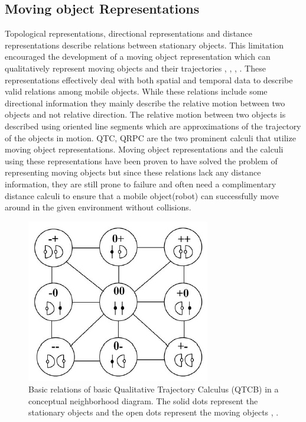		
		\subsection{Moving object Representations}  Topological representations, directional representations
		 and distance representations describe relations between stationary objects. This limitation encouraged the development of a moving object representation which can qualitatively represent moving objects and their trajectories \cite{cohn1997qualitative}, \cite{chen2015survey}, \cite{cohn2001qualitative}, \cite{cohn2008qualitative} . These representations effectively deal with both spatial and temporal data to describe valid relations among mobile objects. While these relations include some directional information they mainly describe the relative motion between two objects and not relative direction. The relative motion between two objects is described using oriented line segments which are approximations of the trajectory of the objects in motion. QTC, QRPC are the two prominent calculi that utilize moving object representations. Moving object representations and the calculi using these representations have been proven to have solved the problem of representing moving objects but since these relations lack any distance information, they are still prone to failure and often need a complimentary distance calculi to ensure that a mobile object(robot) can successfully move around in the given environment without collisions.
		
		\begin{figure}[h]
			\centering
			\includegraphics[scale=1]{images/qtcb}
			\caption{Basic relations of basic Qualitative Trajectory Calculus (QTCB) in a conceptual neighborhood diagram. The solid dots represent the stationary objects and the open dots represent the moving objects \cite{chen2015survey}, \cite{van2004representing}.}
			\label{fig:qtcb}
		\end{figure}		
		
